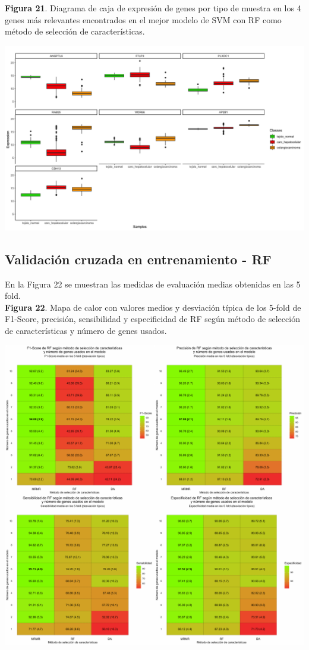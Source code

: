 \newpage
\textbf{Figura 21}. Diagrama de caja de expresión de genes por tipo de muestra en los 4 genes más relevantes encontrados en el mejor modelo de SVM con RF como método de selección de características.
\begin{center}
	\includegraphics[width=1\textwidth]{figuras/21_higado_multiclase_14_svm_boxplots_mejor_metodo.png} 
\end{center}

\newpage
\subsection{Validación cruzada en entrenamiento - RF}

En la Figura 22 se muestran las medidas de evaluación medias obtenidas en las 5 fold.\\

\textbf{Figura 22}. Mapa de calor con valores medios y desviación típica de los 5-fold de F1-Score, precisión, sensibilidad y especificidad de RF según método de selección de características y número de genes usados.
\begin{center}
	\includegraphics[width=1\textwidth]{figuras/22_higado_multiclase_heatmap_rf.pdf} 
\end{center}

